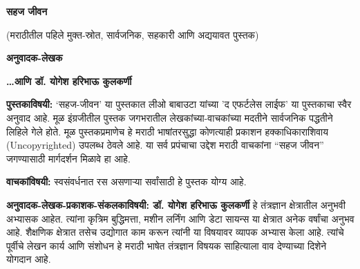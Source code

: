 \documentclass{article}
\begin{document}
\thispagestyle{empty}
\null\vfill

\begin{center}
{\fontsize{64}{78}\selectfont\color{titleorange}\textbf{सहज जीवन}}

\vspace{1em}

{\fontsize{10}{14}\selectfont\color{subtitleblue}(मराठीतील पहिले मुक्त-स्रोत, सार्वजनिक, सहकारी आणि अद्ययावत पुस्तक)}

\vspace{10em}

{\fontsize{12}{14}\selectfont\color{authorgreen}\textbf{अनुवादक-लेखक}}

\vspace{1em}

{\fontsize{18}{20}\selectfont\color{authorgreen}\textbf{\ldots आणि  डॉ. योगेश हरिभाऊ कुलकर्णी}}
\end{center}

\vfill\null
\clearpage

\thispagestyle{empty}
\vspace*{0.5in}

\noindent\textbf{पुस्तकाविषयी:} ‘सहज-जीवन’ या पुस्तकात लीओ बाबाउटा यांच्या 'द एफर्टलेस लाईफ' या पुस्तकाचा स्वैर अनुवाद आहे.  मूळ इंग्रजीतील पुस्तक जगभरातील लेखकांच्या-वाचकांच्या मदतीने सार्वजनिक पद्धतीने लिहिले गेले होते.  मूळ पुस्तकप्रमाणेच  हे मराठी भाषांतरसुद्धा  कोणत्याही प्रकाशन हक्काधिकाराशिवाय (Uncopyrighted) उपलब्ध ठेवले आहे. या सर्व प्रपंचाचा उद्देश मराठी वाचकांना ``सहज जीवन'' जगण्यासाठी मार्गदर्शन मिळावे हा आहे. 

\vspace{1.5em}

\noindent\textbf{वाचकांविषयी:} स्वसंवर्धनात रस असणाऱ्या सर्वांसाठी हे पुस्तक योग्य आहे.

\vspace{1.5em}

\noindent\textbf{अनुवादक-लेखक-प्रकाशक-संकलकाविषयी: डॉ. योगेश हरिभाऊ कुलकर्णी} हे तंत्रज्ञान क्षेत्रातील अनुभवी अभ्यासक आहेत. त्यांना कृत्रिम बुद्धिमत्ता, मशीन लर्निंग आणि डेटा सायन्स या क्षेत्रात अनेक वर्षांचा अनुभव आहे. शैक्षणिक क्षेत्रात तसेच उद्योगात काम करून त्यांनी या विषयावर व्यापक अभ्यास केला आहे. त्यांचे पूर्वीचे लेखन कार्य आणि संशोधन हे मराठी भाषेत तंत्रज्ञान विषयक साहित्याला वाव देण्याच्या दिशेने योगदान आहे.
\end{document}
